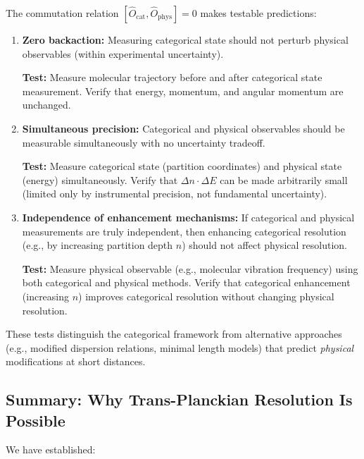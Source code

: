 \documentclass[twocolumn,10pt]{article}
\theoremstyle{remark}
\begin{document}
The commutation relation $[\hat{O}_{\text{cat}}, \hat{O}_{\text{phys}}] = 0$ makes testable predictions:

\begin{enumerate}
    \item \textbf{Zero backaction:} Measuring categorical state should not perturb physical observables (within experimental uncertainty).
    
    \textbf{Test:} Measure molecular trajectory before and after categorical state measurement. Verify that energy, momentum, and angular momentum are unchanged.
    
    \item \textbf{Simultaneous precision:} Categorical and physical observables should be measurable simultaneously with no uncertainty tradeoff.
    
    \textbf{Test:} Measure categorical state (partition coordinates) and physical state (energy) simultaneously. Verify that $\Delta n \cdot \Delta E$ can be made arbitrarily small (limited only by instrumental precision, not fundamental uncertainty).
    
    \item \textbf{Independence of enhancement mechanisms:} If categorical and physical measurements are truly independent, then enhancing categorical resolution (e.g., by increasing partition depth $n$) should not affect physical resolution.
    
    \textbf{Test:} Measure physical observable (e.g., molecular vibration frequency) using both categorical and physical methods. Verify that categorical enhancement (increasing $n$) improves categorical resolution without changing physical resolution.
\end{enumerate}

These tests distinguish the categorical framework from alternative approaches (e.g., modified dispersion relations, minimal length models) that predict \textit{physical} modifications at short distances.

\subsection{Summary: Why Trans-Planckian Resolution Is Possible}

We have established:
\end{document}
